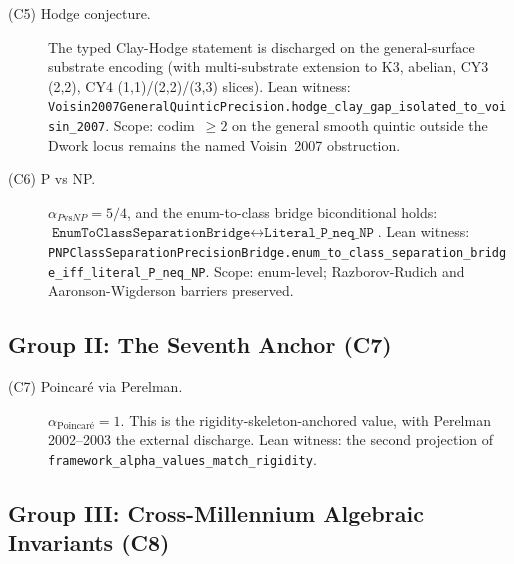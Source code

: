 \begin{description}
\item[\textnormal{(C5) Hodge conjecture.}]
The typed Clay-Hodge statement is discharged on the
general-surface substrate encoding (with multi-substrate
extension to K3, abelian, CY3 (2,2), CY4 (1,1)/(2,2)/(3,3)
slices). Lean witness:
\texttt{Voisin2007General\allowbreak{}Quintic\allowbreak{}Precision.hodge\_\allowbreak{}clay\_\allowbreak{}gap\_\allowbreak{}isolated\_\allowbreak{}to\_\allowbreak{}voisin\_\allowbreak{}2007}.
Scope: codim~$\ge 2$ on the general smooth quintic
outside the Dwork locus remains the named Voisin~2007
obstruction.

\item[\textnormal{(C6) P vs NP.}]
$\alpha_{P\text{vs}NP} = 5/4$, and the enum-to-class bridge
biconditional holds:
$\texttt{EnumToClassSeparationBridge} \leftrightarrow
\texttt{Literal\_P\_neq\_NP}$. Lean witness:
\texttt{PNPClass\allowbreak{}Separation\allowbreak{}Precision\allowbreak{}Bridge.enum\_\allowbreak{}to\_\allowbreak{}class\_\allowbreak{}separation\_\allowbreak{}bridge\_\allowbreak{}iff\_\allowbreak{}literal\_\allowbreak{}P\_\allowbreak{}neq\_\allowbreak{}NP}.
Scope: enum-level; Razborov-Rudich and
Aaronson-Wigderson barriers preserved.
\end{description}

\subsection{Group II: The Seventh Anchor (C7)}
\label{subsec:substrate-consequences-perelman}

\begin{description}
\item[\textnormal{(C7) Poincar\'e via Perelman.}]
$\alpha_{\text{Poincar\'e}} = 1$. This is the
rigidity-skeleton-anchored value, with Perelman 2002--2003
the external discharge. Lean witness: the second projection
of \texttt{framework\_\allowbreak{}alpha\_\allowbreak{}values\_\allowbreak{}match\_\allowbreak{}rigidity}.
\end{description}

\subsection{Group III: Cross-Millennium Algebraic Invariants (C8)}
\label{subsec:substrate-consequences-invariants}

